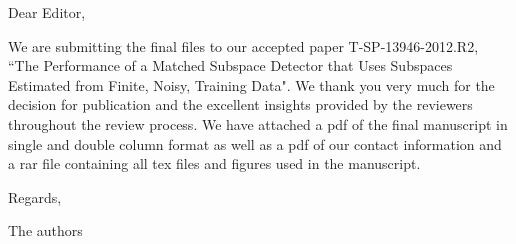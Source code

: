 \documentclass[11pt]{article}
\begin{document}
\noindent Dear Editor,

\vspace{0.1in}

\noindent We are submitting the final files to our accepted paper T-SP-13946-2012.R2, ``The
Performance of a Matched Subspace Detector that Uses Subspaces Estimated from Finite,
Noisy, Training Data". We thank you very much for the decision for publication and the
excellent insights provided by the reviewers throughout the review process. We have
attached a pdf of the final manuscript in single and double column format as well as a pdf
of our contact information and a rar file containing all tex files and figures used in
the manuscript.

\vspace{0.1in}

\noindent Regards,

\noindent The authors
\end{document}
